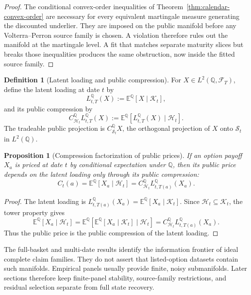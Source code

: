 \documentclass[11pt,a4paper]{amsart}
\theoremstyle{plain}
\newtheorem{proposition}[theorem]{Proposition}
\theoremstyle{definition}
\newtheorem{definition}[theorem]{Definition}
\theoremstyle{remark}
\newcommand{\QQ}{\mathbb{Q}}
\newcommand{\EE}{\mathbb{E}}
\newcommand{\cF}{\mathcal{F}}
\newcommand{\cH}{\mathcal{H}}
\newcommand{\cK}{\mathcal{K}}
\newcommand{\cS}{\mathcal{S}}
\begin{document}
\begin{proof}
The conditional convex-order inequalities of Theorem~\ref{thm:calendar-convex-order} are necessary
for every equivalent martingale measure generating the discounted underlier.  They are imposed on
the public manifold before any Volterra--Perron source family is chosen.  A violation therefore
rules out the manifold at the martingale level.  A fit that matches separate maturity slices but
breaks those inequalities produces the same obstruction, now inside the fitted source family.
\end{proof}


\begin{definition}[Latent loading and public compression]\label{def:latent-loading}
For \(X\in L^2(\QQ,\cF_T)\), define the latent loading at date \(t\) by
\[
        L_{t,T}^\QQ(X):=\EE^\QQ[X\mid\cK_t],
\]
and its public compression by
\[
        C_{\cH_t}^\QQ L_{t,T}^\QQ(X)
        :=
        \EE^\QQ[L_{t,T}^\QQ(X)\mid\cH_t].
\]
The tradeable public projection is \(C_{\cS_t}^\QQ X\), the orthogonal projection of \(X\) onto
\(\cS_t\) in \(L^2(\QQ)\).
\end{definition}

\begin{proposition}[Compression factorization of public prices]\label{prop:compression-factor}
If an option payoff \(X_a\) is priced at date \(t\) by conditional expectation under \(\QQ\), then
its public price depends on the latent loading only through its public compression:
\[
        C_t(a)
        =
        \EE^\QQ[X_a\mid\cH_t]
        =
        C_{\cH_t}^\QQ L_{t,T(a)}^\QQ(X_a).
\]
\end{proposition}

\begin{proof}
The latent loading is \(L_{t,T(a)}^\QQ(X_a)=\EE^\QQ[X_a\mid\cK_t]\).  Since
\(\cH_t\subseteq\cK_t\), the tower property gives
\[
        \EE^\QQ[X_a\mid\cH_t]
        =
        \EE^\QQ[\EE^\QQ[X_a\mid\cK_t]\mid\cH_t]
        =
        C_{\cH_t}^\QQ L_{t,T(a)}^\QQ(X_a).
\]
Thus the public price is the public compression of the latent loading.
\end{proof}

The full-basket and multi-date results identify the information frontier of ideal complete claim
families.  They do not assert that listed-option datasets contain such manifolds.  Empirical
panels usually provide finite, noisy submanifolds.  Later sections therefore keep finite-panel
stability, source-family restrictions, and residual selection separate from full state recovery.
\end{document}
